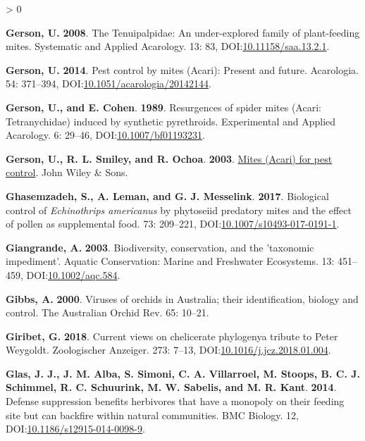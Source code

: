 \documentclass{ufdissertation}[overrideChapters] %
\newlength{\cslhangindent}
\newenvironment{CSLReferences}[2] %
 {%
  \setlength{\parindent}{0pt}
  \ifodd #1 \everypar{\setlength{\hangindent}{\cslhangindent}}\ignorespaces\fi
  \ifnum #2 > 0
  \setlength{\parskip}{#2\baselineskip}
  \fi
 }%
 {}
\begin{document}
{\begin{CSLReferences}{1}{1}
\leavevmode{}%
\textbf{Gerson, U.} \textbf{2008}. The {Tenuipalpidae}: An under-explored family of plant-feeding mites. Systematic and Applied Acarology. 13: 83, DOI:\href{https://doi.org/10.11158/saa.13.2.1}{10.11158/saa.13.2.1}.

\leavevmode{}%
\textbf{Gerson, U.} \textbf{2014}. Pest control by mites ({Acari}): Present and future. Acarologia. 54: 371--394, DOI:\href{https://doi.org/10.1051/acarologia/20142144}{10.1051/acarologia/20142144}.

\leavevmode{}%
\textbf{Gerson, U., and E. Cohen}. \textbf{1989}. Resurgences of spider mites ({Acari}: {Tetranychidae}) induced by synthetic pyrethroids. Experimental and Applied Acarology. 6: 29--46, DOI:\href{https://doi.org/10.1007/bf01193231}{10.1007/bf01193231}.

\leavevmode{}%
\textbf{Gerson, U., R. L. Smiley, and R. Ochoa}. \textbf{2003}. \href{https://doi.org/10.1002/9780470750995}{Mites ({Acari}) for pest control}. John Wiley \& Sons.

\leavevmode{}%
\textbf{Ghasemzadeh, S., A. Leman, and G. J. Messelink}. \textbf{2017}. Biological control of {\emph{Echinothrips americanus}} by phytoseiid predatory mites and the effect of pollen as supplemental food. 73: 209--221, DOI:\href{https://doi.org/10.1007/s10493-017-0191-1}{10.1007/s10493-017-0191-1}.

\leavevmode{}%
\textbf{Giangrande, A.} \textbf{2003}. Biodiversity, conservation, and the 'taxonomic impediment'. Aquatic Conservation: Marine and Freshwater Ecosystems. 13: 451--459, DOI:\href{https://doi.org/10.1002/aqc.584}{10.1002/aqc.584}.

\leavevmode{}%
\textbf{Gibbs, A.} \textbf{2000}. Viruses of orchids in {Australia}; their identification, biology and control. The {Australia}n Orchid Rev. 65: 10--21.

\leavevmode{}%
\textbf{Giribet, G.} \textbf{2018}. Current views on chelicerate phylogeny{\textemdash}a tribute to {Peter Weygoldt}. Zoologischer Anzeiger. 273: 7--13, DOI:\href{https://doi.org/10.1016/j.jcz.2018.01.004}{10.1016/j.jcz.2018.01.004}.

\leavevmode{}%
\textbf{Glas, J. J., J. M. Alba, S. Simoni, C. A. Villarroel, M. Stoops, B. C. J. Schimmel, R. C. Schuurink, M. W. Sabelis, and M. R. Kant}. \textbf{2014}. Defense suppression benefits herbivores that have a monopoly on their feeding site but can backfire within natural communities. {BMC} Biology. 12, DOI:\href{https://doi.org/10.1186/s12915-014-0098-9}{10.1186/s12915-014-0098-9}.


\end{CSLReferences}}
\end{document}
